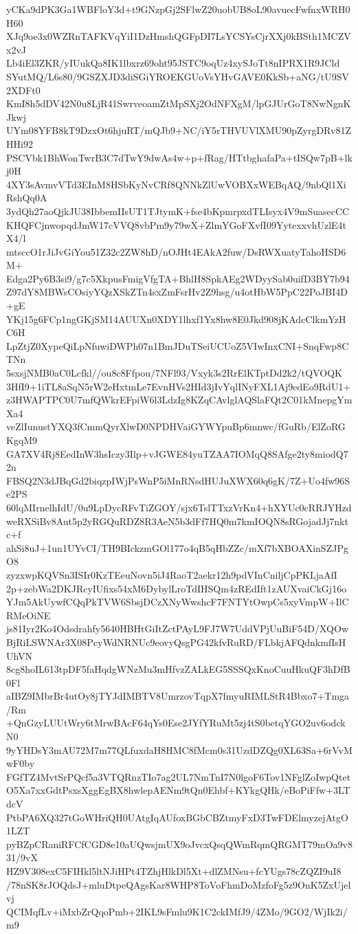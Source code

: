 yCKa9dPK3Ga1WBFloY3d+t9GNzpGj2SFlwZ20uobUB8oL90avuecFwfnxWRH0H60
XJq9oe3x0WZRnTAFKVqYiI1DzHmshQGFpDI7LsYCSYsCjrXXj0kBSth1MCZVx2vJ
Lb4iEl3ZKR/yIUukQa8IK1lbxrz69oht95JSTC9oqUz4xySJoTt8nIPRX1R9JCld
SYutMQ/L6s80/9GSZXJD3diSGiYROEKGUoVsYHvGAVE0KkSb+aNG/tU9SV2XDFt0
KmI8h5dDV42N0u8LjR41SwrveoamZtMpSXj2OdNFXgM/lpGJUrGoT8NwNgnKJkwj
UYm08YFB8kT9DzxOt6hjuRT/mQJb9+NC/iY5rTHVUVlXMU90pZyrgDRv81ZHHi92
PSCVbk1BhWonTwrB3C7dTwY9dwAs4w+p+fRag/HTtbghafaPa+tISQw7pB+lkj0H
4XY3sAvmvVTd3EInM8HSbKyNvCRf8QNNkZlUwVOBXxWEBqAQ/9nbQl1XiRshQq0A
3ydQh27aoQjkJU38IbbemIIsUT1TJtymK+fse4bKpmrpxdTLIsyx4V9mSuasecCC
KHQFCjnwopqdJmW17cVVQ8vbPm9y79wX+ZlmYGoFXvfI09YytexxvhUzlE4tX4/l
mtsccO1rJiJvGiYou51Z32c2ZW8hD/nOJHt4EAkA2fuw/DsRWXuatyTahoHSD6M+
Edga2Py6B3si9/g7c5XkpusFmigVfgTA+BhlH8SpkAEg2WDyySab0uifD3BY7b94
Z97dY8MBWsCOsiyYQzXSkZTn4sxZmFsrHv2Z9hsg/u4otHbW5PpC22PoJBI4D+gE
YKj15g6FCp1ngGKjSM14AUUXn0XDY1lhxf1Yx8hw8E0Jkd908jKAdcClkmYzHC6H
LpZtjZ0XypeQiLpNfuwiDWPh07n1BmJDuTSeiUCUoZ5VIwInxCNI+SnqFwp8CTNn
5sxsjNMB0aC0Lcfkl//ou8c8Ffpou/7NFl93/Vxyk3s2RrElKTptDd2k2/tQVOQK
3HfI9+1iTL8aSqN5rW2eHxtmLe7EvnHVs2HId3jIvYqlINyFXL1Aj9edEo9RdU1+
z3HWAPTPC0U7mfQWkrEFpiW6l3LdzIg8KZqCAvlglAQSlaFQt2C01kMnepgYmXa4
veZlIunustYXQ3fCmmQyrXlwD0NPDHVaiGYWYpuBp6mnwc/fGuRb/ElZoRGKgqM9
GA7XV4Rj8EedInW3hsIczy3Ilp+vJGWE84yuTZAA7IOMqQ8SAfge2ty8miodQ72n
FBSQ2N3dJBqGd2biqzpIWjPsWnP5iMnRNsdHUJuXWX60q6gK/7Z+Uo4fw96Se2PS
60lqMIrnelhIdU/0u9LpDycRFvTiZGOY/sjx6TslTTxzVrKn4+hXYUc0cRRJYHzd
weRXSiBv8Aut5p2yRGQuRDZ8R3AeN5b3dFf7HQ0m7kmIOQN8sRGojadJj7nktc+f
ahSi8uJ+1un1UYvCI/TH9BIckzmGOl177o4qB5qHbZZc/mXf7bXBOAXinSZJPgO8
zyzxwpKQVSn3ISIr0KzTEeuNovn5iJ4RaoT2aekr12h9pdVInCniljCpPKLjaAfI
2p+zebWa2DKJRcyIUfixs54xM6DybylLroTdIHSQm4zREdIft1zAUXvaiCkGj16o
YJm5AkUywfCQqPkTVW6SbsjDCzXNyWwshcF7FNTYtOwpCs5xyVmpW+IlCRMeOiNE
js81Iyr2Ko4Odsdrahfy5640HBHtGiItZctPAyL9FJ7W7UddVPjUuBiF54D/XQOw
BjRiLSWNAr3X08PcyWdNRNUc9eovyQsgPG42kfvRuRD/FLbkjAFQdnkmfIsHUhVN
8cg8hoIL613tpDF5faHqdgWNzMu3mHfvzZALkEG5SSSQxKnoCuuHkuQF3hDfB0Fl
aIBZ9IMbrBr4utOy8jTYJdIMBTV8UmrzovTqpX7fmyuRIMLStR4Bbxo7+Tmga/Rm
+QnGzyLUUtWry6tMrwBAcF64qYs0Ese2JYfYRuMt5zj4tS0betqYGO2uv6odckN0
9yYHDsY3mAU72M7m77QLfuxdaH8HMC8fMcm0s31UzdDZQg0XL63Sa+6rVvMwF0by
FGfTZ4MvtSrPQcf5a3VTQRnzTIo7ag2UL7NmTnI7N0lgoF6Tov1NFglZoIwpQtet
O5Xa7xxGdtPsxsXggEgBX8hwlepAENm9tQn0Ehbf+KYkgQHk/eBoPiFfw+3LTdcV
PtbPA6XQ327tGoWHriQH0UAtgIqAUfoxBGbCBZtmyFxD3TwFDElmyzejAtgO1LZT
pyBZpCRaniRFCfCGD8e10aUQwsjmUX9oJvcxQsqQWmRqmQRGMT79mOa9v831/9vX
HZ9V308exC5FIHkl5ltNJiHPt4TZhjHlkDl5Xt+dlZMNsu+fcYUgs78cZQZI9uI8
/78nSK8rJOQdsJ+mluDtpeQAgsKar8WHP8ToVoFhmDoMzfoFg5z9OnK5ZxUjelvj
QCIMqfLv+iMxbZrQqoPmb+2IKL9sFmlu9K1C2ckIMfJ9/4ZMo/9GO2/WjIk2i/m9
